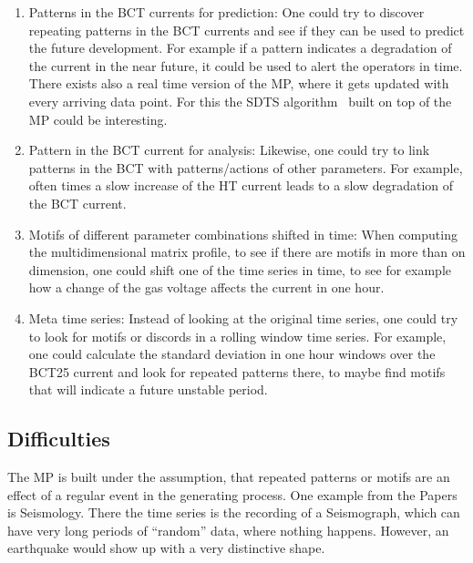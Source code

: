 \documentclass[12pt,a4paper]{article}
\providecommand{\tightlist}{%
	\setlength{\itemsep}{0pt}\setlength{\parskip}{0pt}}
\begin{document}
\begin{enumerate}
\def\labelenumi{\arabic{enumi}.}
\tightlist
	\item
	  Patterns in the BCT currents for prediction: One could try to discover repeating patterns in the BCT currents and see if they can be used to predict the future development. For example if a pattern indicates a degradation of the current in the near future, it could be used to alert the operators in time. There exists also a real time version of the MP, where it gets updated with every arriving data point. For this the SDTS algorithm~\cite{Yeh:MatrixProfileIV} built on top of the MP could be interesting.
	\item
	  Pattern in the BCT current for analysis: Likewise, one could try to link patterns in the BCT with patterns/actions of other parameters. For example, often times a slow increase of the HT current leads to a slow degradation of the BCT current.
	\item
	  Motifs of different parameter combinations shifted in time: When computing the multidimensional matrix profile, to see if there are
	  motifs in more than on dimension, one could shift one of the time series in time, to see for example how a change of the gas voltage affects the current in one hour.
	\item
	  Meta time series: Instead of looking at the original time series, one could try to look for motifs or discords in a rolling window time series. For example, one could calculate the standard deviation in one hour windows over the BCT25 current and look for repeated patterns there, to maybe find motifs that will indicate a future unstable period.
\end{enumerate}

\hypertarget{difficulties}{%
\subsection{Difficulties}\label{difficulties}}

The MP is built under the assumption, that repeated patterns or motifs are an effect of a regular event in the generating process. One example from the Papers is Seismology. There the time series is the recording of a Seismograph, which can have very long periods of ``random'' data, where nothing happens. However, an earthquake would show up with a very distinctive shape.
\end{document}
